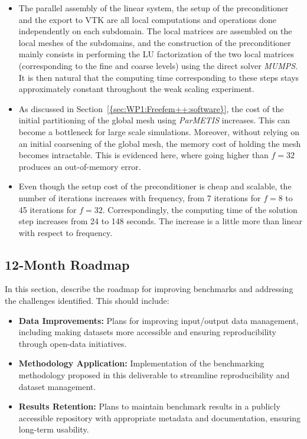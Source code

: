 \begin{itemize}
\item The parallel assembly of the linear system, the setup of the preconditioner and the export to VTK are all local computations and operations done independently on each subdomain. The local matrices are assembled on the local meshes of the subdomains, and the construction of the preconditioner mainly consists in performing the LU factorization of the two local matrices (corresponding to the fine and coarse levels) using the direct solver \textit{MUMPS}. It is then natural that the computing time corresponding to these steps stays approximately constant throughout the weak scaling experiment.
\item As discussed in Section~\cref{{sec:WP1:Freefem++:software}}, the cost of the initial partitioning of the global mesh using \textit{ParMETIS} increases. This can become a bottleneck for large scale simulations. Moreover, without relying on an initial coarsening of the global mesh, the memory cost of holding the mesh becomes intractable. This is evidenced here, where going higher than $f=32$ produces an out-of-memory error.
\item Even though the setup cost of the preconditioner is cheap and scalable, the number of iterations increases with frequency, from 7 iterations for $f=8$ to 45 iterations for $f=32$. Correspondingly, the computing time of the solution step increases from 24 to 148 seconds. The increase is a little more than linear with respect to frequency.
\end{itemize}

\subsection{12-Month Roadmap}
\label{sec:WP3:Freefem++:roadmap}

In this section, describe the roadmap for improving benchmarks and addressing the challenges identified. This should include:
\begin{itemize}
    \item \textbf{Data Improvements:} Plans for improving input/output data management, including making datasets more accessible and ensuring reproducibility through open-data initiatives.
    \item \textbf{Methodology Application:} Implementation of the benchmarking methodology proposed in this deliverable to streamline reproducibility and dataset management.
    \item \textbf{Results Retention:} Plans to maintain benchmark results in a publicly accessible repository with appropriate metadata and documentation, ensuring long-term usability.
\end{itemize}

